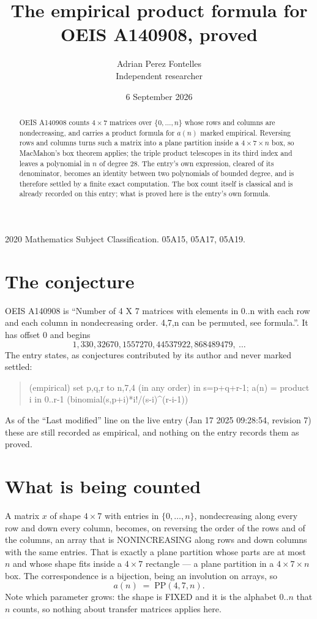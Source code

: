 \documentclass[11pt,a4paper]{article}
\title{The empirical product formula for OEIS A140908, proved}
\author{Adrian Perez Fontelles\\ \small Independent researcher}
\date{6 September 2026}
\theoremstyle{plain}
\theoremstyle{definition}
\begin{document}
\maketitle

\begin{abstract}
OEIS A140908 counts $4\times7$ matrices over $\{0,\dots,n\}$ whose rows and columns are
nondecreasing, and carries a product formula for $a(n)$ marked empirical. Reversing rows and
columns turns such a matrix into a plane partition inside a $4\times7\times n$ box, so
MacMahon's box theorem applies; the triple product telescopes in its third index and leaves a
polynomial in $n$ of degree $28$. The entry's own expression, cleared of its denominator,
becomes an identity between two polynomials of bounded degree, and is therefore settled by a
finite exact computation. The box count itself is classical and is already recorded on this
entry; what is proved here is the entry's own formula.
\end{abstract}

\noindent\small 2020 Mathematics Subject Classification. 05A15, 05A17, 05A19.\normalsize

\section{The conjecture}

OEIS A140908 is ``Number of 4 X 7 matrices with elements in 0..n with each row and each column in nondecreasing order. 4,7,n can be permuted, see formula.''. It has offset $0$ and begins
\[
1, 330, 32670, 1557270, 44537922, 868489479,\ \dots
\]
The entry states, as conjectures contributed by its author and never marked settled:
\begin{quote}
(empirical) set p,q,r to n,7,4 (in any order) in s=p+q+r-1; a(n) = product {i in 0..r-1} (binomial(s,p+i)*i!/(s-i)\^{}(r-i-1))

\end{quote}
As of the ``Last modified'' line on the live entry (Jan 17 2025 09:28:54, revision 7) these are still
recorded as empirical, and nothing on the entry records them as proved.

\section{What is being counted}

A matrix $x$ of shape $4\times7$ with entries in $\{0,\dots,n\}$, nondecreasing along
every row and down every column, becomes, on reversing the order of the rows and of the
columns, an array that is NONINCREASING along rows and down columns with the same entries. That
is exactly a plane partition whose parts are at most $n$ and whose shape fits inside a
$4\times7$ rectangle --- a plane partition in a $4\times7\times n$ box. The
correspondence is a bijection, being an involution on arrays, so
\[
a(n)\;=\;\mathrm{PP}(4,7,n).
\]
Note which parameter grows: the shape is FIXED and it is the alphabet $0..n$ that $n$ counts,
so nothing about transfer matrices applies here.
\end{document}
